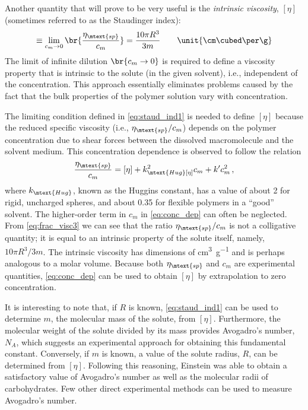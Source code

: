 Another quantity that will prove to be very useful is the \emph{intrinsic viscosity}, \( [\eta] \) (sometimes referred to as the Staudinger index):
\begin{equation}
	[\eta] \equiv \lim_{c_m \to 0}\br{\frac{\eta_\mtext{sp}}{c_m}} = \frac{10\pi R^3}{3 m} \qquad \unit{\cm\cubed \per \g}
	\label{eq:staud_ind1}
\end{equation}
The limit of infinite dilution \( \br{ c_m \to 0} \) is required to define a viscosity property that is intrinsic to the solute (in the given solvent), i.e., independent of the concentration. 
This approach essentially eliminates problems caused by the fact that the bulk properties of the polymer solution vary with concentration. 

The limiting condition defined in \cref{eq:staud_ind1} is needed to define \( [\eta] \) because the reduced specific viscosity (i.e., \( \eta_\mtext{sp}/c_m \)) depends on the polymer concentration due to shear forces between the dissolved macromolecule and the solvent medium. 
This concentration dependence is observed to follow the relation
\begin{equation}
	\frac{\eta_\mtext{sp}}{c_m} = [\eta] + k_\mtext{Hug} [\eta]^2 c_m + k' c_m^2 \, ,
	\label{eq:conc_dep}
\end{equation}
where \( k_\mtext{Hug} \), known as the Huggins constant, has a value of about \num{2} for rigid, uncharged spheres, and about \num{0.35} for flexible polymers in a ``good'' solvent.\autocite{tanford61} 
The higher-order term in \( c_m \) in \cref{eq:conc_dep} can often be neglected. 
From \cref{eq:frac_visc3} we can see that the ratio \( \eta_\mtext{sp}/c_m \) is not a colligative quantity; it is equal to an intrinsic property of the solute itself, namely, \( 10 \pi R^3 / 3 m \). 
The intrinsic viscosity has dimensions of \unit{\cm\cubed \per\g} and is perhaps analogous to a molar volume. 
Because both \( \eta_\mtext{sp} \) and \( c_m \) are experimental quantities, \cref{eq:conc_dep} can be used to obtain \( [\eta] \) by extrapolation to zero concentration.

It is interesting to note that, if \( R \) is known, \cref{eq:staud_ind1} can be used to determine \( m \), the molecular mass of the solute, from \( [\eta] \). 
Furthermore, the molecular weight of the solute divided by its mass provides Avogadro's number, \( N_A \), which suggests an experimental approach for obtaining this fundamental constant. 
Conversely, if \( m \) is known, a value of the solute radius, \( R \), can be determined from \( [\eta] \). 
Following this reasoning, Einstein was able to obtain a satisfactory value of Avogadro's number as well as the molecular radii of carbohydrates. 
Few other direct experimental methods can be used to measure Avogadro's number.


